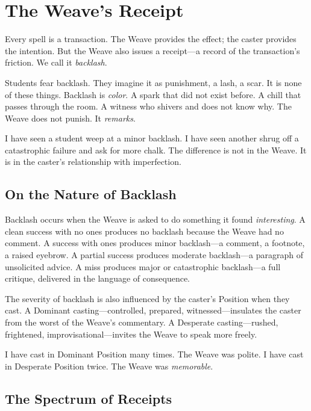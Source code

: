 \section{The Weave's Receipt}

Every spell is a transaction. The Weave provides the effect; the caster provides the intention. But the Weave also issues a receipt---a record of the transaction's friction. We call it \emph{backlash}.

Students fear backlash. They imagine it as punishment, a lash, a scar. It is none of these things. Backlash is \emph{color}. A spark that did not exist before. A chill that passes through the room. A witness who shivers and does not know why. The Weave does not punish. It \emph{remarks}.

I have seen a student weep at a minor backlash. I have seen another shrug off a catastrophic failure and ask for more chalk. The difference is not in the Weave. It is in the caster's relationship with imperfection.

\subsection{On the Nature of Backlash}

Backlash occurs when the Weave is asked to do something it found \emph{interesting}. A clean success with no ones produces no backlash because the Weave had no comment. A success with ones produces minor backlash---a comment, a footnote, a raised eyebrow. A partial success produces moderate backlash---a paragraph of unsolicited advice. A miss produces major or catastrophic backlash---a full critique, delivered in the language of consequence.

The severity of backlash is also influenced by the caster's Position when they cast. A Dominant casting---controlled, prepared, witnessed---insulates the caster from the worst of the Weave's commentary. A Desperate casting---rushed, frightened, improvisational---invites the Weave to speak more freely.

I have cast in Dominant Position many times. The Weave was polite. I have cast in Desperate Position twice. The Weave was \emph{memorable}.

\subsection{The Spectrum of Receipts}

